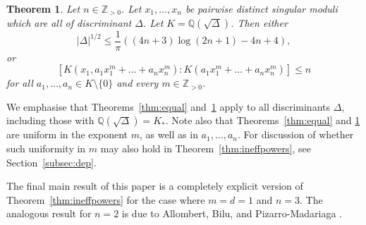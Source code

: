 \documentclass[11pt,a4paper, british]{amsart}
\newtheorem{thm}{Theorem}[section]
\theoremstyle{definition}
\theoremstyle{remark}
\numberwithin{equation}{section}
\newcommand{\Q}{\mathbb{Q}} %
\newcommand{\Z}{\mathbb{Z}} %
\begin{document}
	\begin{thm}\label{thm:field}
Let $n \in \Z_{>0}$. Let $x_1, \ldots, x_n$ be  pairwise distinct singular moduli which are all of discriminant $\Delta$. Let $K = \Q(\sqrt{\Delta})$. Then either
\[ \lvert \Delta \rvert^{1/2} \leq \frac{1}{\pi} \left(\left(4n+3\right) \log\left(2n+1\right) -4n + 4\right),\]
or
\[ \left[K\left(x_1, a_1 x_1^m + \ldots + a_n x_n^m\right) : K\left(a_1 x_1^m + \ldots + a_n x_n^m\right) \right] \leq n\]
for all $a_1, \ldots, a_n \in K \setminus \{0\}$ and every $m \in \Z_{>0}$.
	\end{thm}
	
	We emphasise that Theorems~\ref{thm:equal} and~\ref{thm:field} apply to all discriminants $\Delta$, including those with $\Q(\sqrt{\Delta}) = K_*$. Note also that Theorems~\ref{thm:equal} and \ref{thm:field} are uniform in the exponent $m$, as well as in $a_1, \ldots, a_n$. For discussion of whether such uniformity in $m$ may also hold in Theorem~\ref{thm:ineffpowers}, see Section~\ref{subsec:dep}.
	
	The final main result of this paper is a completely explicit version of Theorem~\ref{thm:ineffpowers} for the case where $m= d=1$ and $n=3$. The analogous result for $n=2$ is due to Allombert, Bilu, and Pizarro-Madariaga \cite[Theorem~1.2]{AllombertBiluMadariaga15}. 
	
\end{document}

